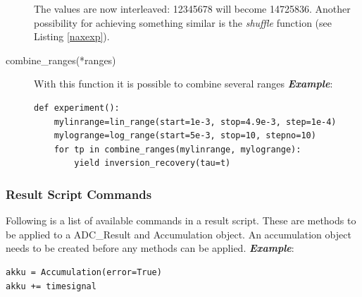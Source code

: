 \documentclass[12pt, a4paper, BCOR10mm, twoside, titlepage, headinclude]{scrbook}
\begin{document}
\begin{description}
The values are now interleaved: 12345678 will become 14725836. Another possibility for achieving something similar is the \emph{shuffle} function (see Listing \ref{naxexp}).


\item[combine\_ranges(*ranges)] With this function it is possible to combine several ranges 
\newline
\emph{\textbf{Example}}:
\begin{lstlisting}
def experiment():
	mylinrange=lin_range(start=1e-3, stop=4.9e-3, step=1e-4)
	mylogrange=log_range(start=5e-3, stop=10, stepno=10)
	for tp in combine_ranges(mylinrange, mylogrange):
		yield inversion_recovery(tau=t)
\end{lstlisting}


\end{description}

\subsubsection{Result Script Commands}
Following is a list of available commands in a result script. These are methods to be applied to a ADC\_Result and  Accumulation  object. An accumulation object needs to be created before any methods can be applied.
\newline
\emph{\textbf{Example}}:
\begin{lstlisting}
akku = Accumulation(error=True)
akku += timesignal
\end{lstlisting}
\end{document}
